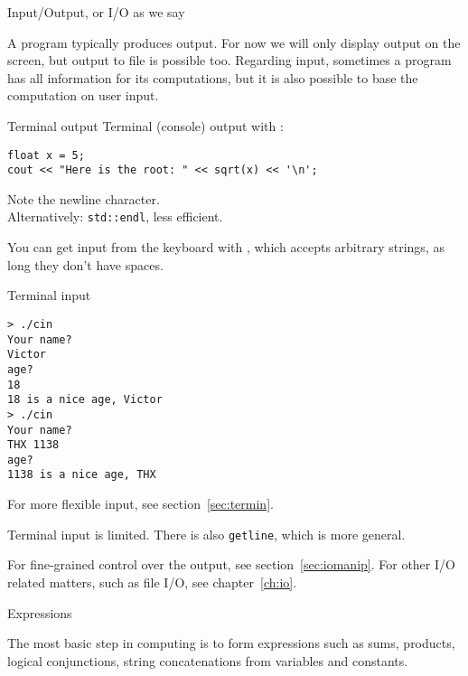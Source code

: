  {Input/Output, or I/O as we say}
\label{sec:io}

A program typically produces output. For now we will only display
output on the screen, but output to file is possible too.  Regarding
input, sometimes a program has all information for its computations,
but it is also possible to base the computation on user input.

\begin{block}{Terminal output}
  \label{sl:cout}
Terminal (console) output with :
\begin{lstlisting}
float x = 5;
cout << "Here is the root: " << sqrt(x) << '\n';
\end{lstlisting}
Note the newline character.\\
Alternatively: \lstinline{std::endl}, less efficient.
\end{block}

You can get input from the keyboard with ,
which accepts arbitrary strings, as long they don't have spaces.

\begin{block}{Terminal input}
  \label{sl:cin}
\begin{multicols}{2}
  \vfill
  \columnbreak
      \begin{mdframed}[backgroundcolor=yellow!80!white!20]%
        \codesize
\begin{verbatim}
> ./cin
Your name?
Victor
age?
18
18 is a nice age, Victor
> ./cin
Your name?
THX 1138
age?
1138 is a nice age, THX
\end{verbatim}
      \end{mdframed}
\end{multicols}
\end{block}

For more flexible input, see section~\ref{sec:termin}.

\begin{slide}{Terminal input}
  \label{sl:cin-more}
   is limited.
  There is also \lstinline{getline}, which is more general.
\end{slide}

For fine-grained control over the output, see section~\ref{sec:iomanip}.
For other I/O related matters, such as file I/O, see chapter~\ref{ch:io}.

 {Expressions}
\label{sec:expr}

The most basic step in computing is to form expressions such as sums,
products, logical conjunctions, string concatenations
from variables and constants.

